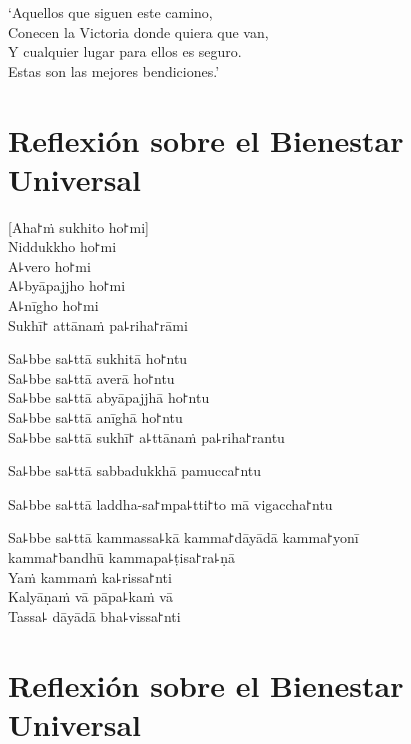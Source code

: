 `Aquellos que siguen este camino,\\
Conecen la Victoria donde quiera que van,\\
Y cualquier lugar para ellos es seguro.\\
Estas son las mejores bendiciones.'

\chapter*[Bienestar Universal]{Reflexión sobre el Bienestar Universal}

\delegateSetUseNext


\begin{leader}
\end{leader}

[Aha꜓ṁ sukhito ho꜓mi]\\
Niddukkho ho꜓mi\\
A꜕vero ho꜓mi\\
A꜕byāpajjho ho꜓mi\\
A꜕nīgho ho꜓mi\\
Sukhī꜓ attānaṁ pa꜕riha꜓rāmi

Sa꜕bbe sa꜕ttā sukhitā ho꜓ntu\\
Sa꜕bbe sa꜕ttā averā ho꜓ntu\\
Sa꜕bbe sa꜕ttā abyāpajjhā ho꜓ntu\\
Sa꜕bbe sa꜕ttā anīghā ho꜓ntu\\
Sa꜕bbe sa꜕ttā sukhī꜓ a꜕ttānaṁ pa꜕riha꜓rantu

Sa꜕bbe sa꜕ttā sabbadukkhā pamucca꜓ntu

Sa꜕bbe sa꜕ttā laddha-sa꜓mpa꜕tti꜓to mā vigaccha꜓ntu

Sa꜕bbe sa꜕ttā kammassa꜕kā kamma꜓dāyādā kamma꜓yonī\\
\vin kamma꜓bandhū kammapa꜕ṭisa꜓ra꜕ṇā\\
Yaṁ kammaṁ ka꜕rissa꜓nti\\
Kalyāṇaṁ vā pāpa꜕kaṁ vā\\
Tassa꜕ dāyādā bha꜕vissa꜓nti

\chapter[Bienestar Universal]{Reflexión sobre el Bienestar Universal}


\begin{leader}
\end{leader}

